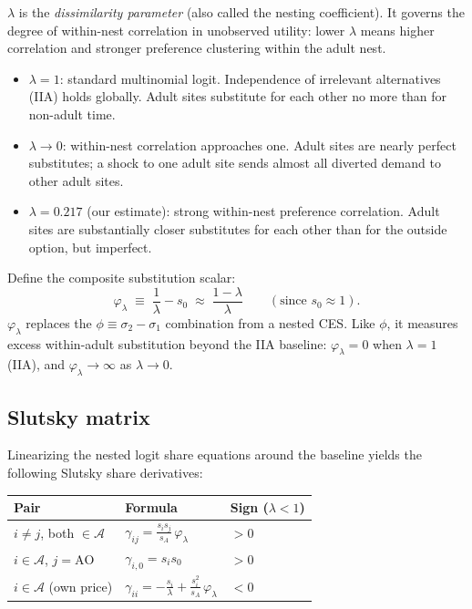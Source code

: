 \documentclass{article}
\begin{document}
$\lambda$ is the \emph{dissimilarity parameter} (also called the nesting
coefficient).  It governs the degree of within-nest correlation in
unobserved utility: lower $\lambda$ means higher correlation and stronger
preference clustering within the adult nest.

\begin{itemize}
  \item $\lambda = 1$: standard multinomial logit.  Independence of irrelevant
    alternatives (IIA) holds globally.  Adult sites substitute for each other
    no more than for non-adult time.
  \item $\lambda \to 0$: within-nest correlation approaches one.  Adult sites
    are nearly perfect substitutes; a shock to one adult site sends almost
    all diverted demand to other adult sites.
  \item $\lambda = 0.217$ (our estimate): strong within-nest preference
    correlation.  Adult sites are substantially closer substitutes for each
    other than for the outside option, but imperfect.
\end{itemize}

Define the composite substitution scalar:
\begin{equation}\label{eq:phi_lambda}
  \varphi_\lambda \;\equiv\; \frac{1}{\lambda} - s_0
  \;\approx\; \frac{1 - \lambda}{\lambda}
  \qquad (\text{since } s_0 \approx 1).
\end{equation}
$\varphi_\lambda$ replaces the $\phi \equiv \sigma_2 - \sigma_1$ combination
from a nested CES.  Like $\phi$, it measures excess within-adult substitution
beyond the IIA baseline: $\varphi_\lambda = 0$ when $\lambda = 1$ (IIA), and
$\varphi_\lambda \to \infty$ as $\lambda \to 0$.

\subsection{Slutsky matrix}

Linearizing the nested logit share equations around the baseline yields the
following Slutsky share derivatives:

\medskip
\begin{center}
\renewcommand{\arraystretch}{1.5}
\begin{tabular}{lll}
  \toprule
  Pair & Formula & Sign ($\lambda < 1$) \\
  \midrule
  $i \neq j$, both $\in \mathcal{A}$ &
    $\displaystyle\gamma_{ij} = \frac{s_i s_j}{s_A}\,\varphi_\lambda$ & $>0$ \\[6pt]
  $i \in \mathcal{A}$, $j = \mathrm{AO}$ &
    $\gamma_{i,0} = s_i s_0$ & $>0$ \\[4pt]
  $i \in \mathcal{A}$ (own price) &
    $\displaystyle\gamma_{ii}
     = -\frac{s_i}{\lambda} + \frac{s_i^2}{s_A}\,\varphi_\lambda$ & $<0$ \\
  \bottomrule
\end{tabular}
\end{center}
\end{document}
